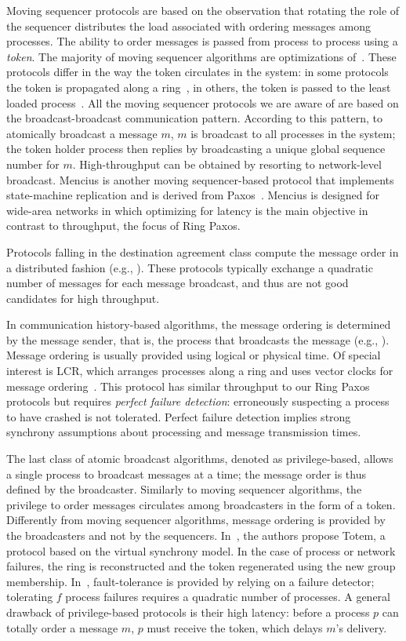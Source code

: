 \documentclass[final,3p,times,twocolumn,authoryear]{elsarticle}
\begin{document}
Moving sequencer protocols are based on the observation that rotating the role of the sequencer distributes the load associated with ordering messages among processes. The ability to order messages is passed from process to process using a \emph{token}. The majority of moving sequencer algorithms are optimizations of~\cite{CM84}. These protocols differ in the way the token circulates in the system: in some protocols the token is propagated along a ring~\cite{CM84,CM95}, in others, the token is passed to the least loaded process~\cite{KK97}. All the moving sequencer protocols we are aware of are based on the broadcast-broadcast communication pattern. According to this pattern, to atomically broadcast a message $m$, $m$ is broadcast to all processes in the system; the token holder process then replies by broadcasting a unique global sequence number for $m$. High-throughput can be obtained by resorting to network-level broadcast.
Mencius is another moving sequencer-based protocol that implements state-machine replication and is derived from Paxos~\cite{mao2008mencius}. 
Mencius is designed for wide-area networks in which optimizing for latency is the main objective in contrast to throughput, the focus of Ring Paxos. 

Protocols falling in the destination agreement class compute the message order in a distributed fashion (e.g., \cite{CT96,FIMR98}). These protocols typically exchange a quadratic number of messages for each message broadcast, and thus are not good candidates for high throughput.

In communication history-based algorithms, the message ordering is determined by the message sender, that is, the process that broadcasts the message (e.g., \cite{Lam78b,Ng91}). Message ordering is usually provided using logical or physical time. Of special interest is LCR, which arranges processes along a ring and uses vector clocks for message ordering~\cite{Guerraoui2010}. This protocol has similar throughput to our Ring Paxos protocols but requires \emph{perfect failure detection}: erroneously suspecting a process to have crashed is not tolerated. Perfect failure detection implies strong synchrony assumptions about processing and message transmission times.

The last class of atomic broadcast algorithms, denoted as privilege-based, allows a single process to broadcast messages at a
time; the message order is thus defined by the broadcaster. Similarly to moving sequencer algorithms, the privilege to order messages circulates among broadcasters in the form of a token. Differently from moving sequencer algorithms, message ordering is provided by the broadcasters and not by the sequencers. In~\cite{amir1995totem}, the authors propose Totem, a protocol based on the virtual synchrony model.  In the case of process or network failures, the ring is reconstructed and the token regenerated using the new group membership. In~\cite{ESU04}, fault-tolerance is provided by relying on a failure detector; tolerating $f$ process failures requires a quadratic number of processes. A general drawback of privilege-based protocols is their high latency: before a process $p$ can totally order a message $m$, $p$ must receive the token, which delays $m$'s delivery.
\end{document}
